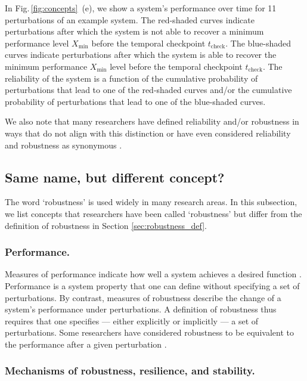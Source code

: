 \documentclass{comnet-mod}
\begin{document}
In Fig.\,\ref{fig:concepts}~(e), we show a system's performance over time for 11 perturbations of an example system. The red-shaded curves indicate perturbations after which the system is not able to recover a minimum performance level $X_{\textrm{min}}$ before the temporal checkpoint $t_{\textrm{check}}$. The blue-shaded curves indicate perturbations after which the system is able to recover the minimum performance $X_{\textrm{min}}$ level before the temporal checkpoint $t_{\textrm{check}}$. The reliability of the system is a function of the cumulative probability of perturbations that lead to one of the red-shaded curves and/or the cumulative probability of perturbations that lead to one of the blue-shaded curves.

We also note that many researchers have defined reliability and/or robustness in ways that do not align with this distinction \cite{Rausand2004, Woods2015} or have even considered reliability and robustness as synonymous \cite{Perez2018}.


\subsection{Same name, but different concept?}\label{sec:homonyms}

The word `robustness' is used widely in many research areas. In this subsection, we list concepts that researchers have been called `robustness' but differ from the definition of robustness in Section \ref{sec:robustness_def}.


\subsubsection{Performance.}\label{sec:performance_concept}

Measures of performance indicate how well a system achieves a desired function \cite{Townley2003}. Performance is a system property that one can define without specifying a set of perturbations. By contrast, measures of robustness describe the change of a system's performance under perturbations. A definition of robustness thus requires that one specifies --- either explicitly or implicitly --- a set of perturbations. Some researchers have considered robustness to be equivalent to the performance after a given perturbation \cite{Gu2020}. 


\subsubsection{Mechanisms of robustness, resilience, and stability.}
\end{document}
